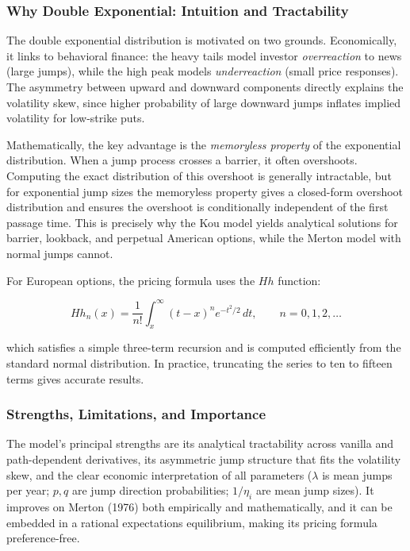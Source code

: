 \documentclass[12pt]{article}
\begin{document}
\subsubsection*{Why Double Exponential: Intuition and Tractability}

The double exponential distribution is motivated on two grounds. Economically, it links
to behavioral finance: the heavy tails model investor \textit{overreaction} to news
(large jumps), while the high peak models \textit{underreaction} (small price responses).
The asymmetry between upward and downward components directly explains the volatility
skew, since higher probability of large downward jumps inflates implied volatility for
low-strike puts.

Mathematically, the key advantage is the \textit{memoryless property} of the exponential
distribution. When a jump process crosses a barrier, it often overshoots. Computing the
exact distribution of this overshoot is generally intractable, but for exponential jump
sizes the memoryless property gives a closed-form overshoot distribution and ensures the
overshoot is conditionally independent of the first passage time. This is precisely why
the Kou model yields analytical solutions for barrier, lookback, and perpetual American
options, while the Merton model with normal jumps cannot.

For European options, the pricing formula uses the $Hh$ function:

\begin{equation}
    Hh_n(x) = \frac{1}{n!}\int_x^{\infty}(t-x)^n e^{-t^2/2}\,dt,
    \qquad n = 0,1,2,\ldots
\end{equation}

which satisfies a simple three-term recursion and is computed efficiently from the
standard normal distribution. In practice, truncating the series to ten to fifteen
terms gives accurate results.

\subsubsection*{Strengths, Limitations, and Importance}

The model's principal strengths are its analytical tractability across vanilla and
path-dependent derivatives, its asymmetric jump structure that fits the volatility skew,
and the clear economic interpretation of all parameters ($\lambda$ is mean jumps per year;
$p, q$ are jump direction probabilities; $1/\eta_i$ are mean jump sizes). It improves on
Merton (1976) both empirically and mathematically, and it can be embedded in a rational
expectations equilibrium, making its pricing formula preference-free.
\end{document}
